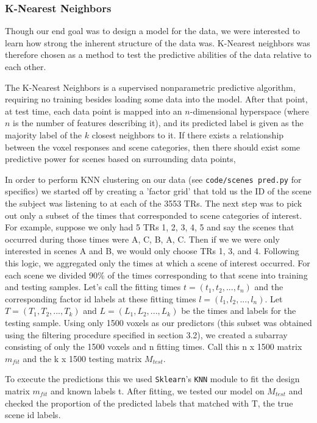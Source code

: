 \subsubsection{K-Nearest Neighbors}
\par Though our end goal was to design a model for the data, we were interested to learn how strong the inherent structure of the data was. K-Nearest neighbors was therefore chosen as a method to test the predictive abilities of the data relative to each other.
\par The K-Nearest Neighbors is a supervised nonparametric predictive algorithm, requiring no training besides loading some data into the model. After that point, at test time, each data point is mapped into an $n$-dimensional hyperspace (where $n$ is the number of features describing it), and its predicted label is given as the majority label of the $k$ closest neighbors to it. If there exists a relationship between the voxel responses and scene categories, then there should exist some predictive power for scenes based on surrounding data points, 

\par In order to perform KNN clustering on our data (see \texttt{code/scenes pred.py} for specifics) we started off by creating a 'factor grid' that told us the ID of the scene the subject was listening to at each of the 3553 TRs. The next step was to pick out only a subset of the times that corresponded to scene categories of interest. For example, suppose we only had 5 TRs 1, 2, 3, 4, 5 and say the scenes that occurred during those times were A, C, B, A, C. Then if we we were only interested in scenes A and B, we would only choose  TRs 1, 3, and 4. Following this logic, we aggregated only the times at which a scene of interest occurred. For each scene we divided  90$\%$ of the times corresponding to that scene into training and testing samples. Let's call the fitting times $t = (t_1, t_2,..., t_n)$ and the corresponding factor id labels at these fitting times $l = (l_1, l_2, ..., l_n)$. Let $T = (T_1, T_2,..., T_k)$ and $L = (L_1, L_2, ..., L_k)$ be the times and labels for the testing sample. Using only 1500 voxels as our predictors (this subset was obtained using the filtering procedure specified in section 3.2), we created a subarray consisting of only the 1500 voxels and n fitting times. Call this n x 1500 matrix $m_{fit}$ and the k x 1500 testing matrix $M_{test}$. 
\par To execute the predictions this we used \texttt{Sklearn}'s \texttt{KNN} module to fit the design matrix $m_{fit}$ and known labels t. After fitting, we tested our model on $M_{test}$ and checked the proportion of the predicted labels that matched with T, the  true scene id labels.  

